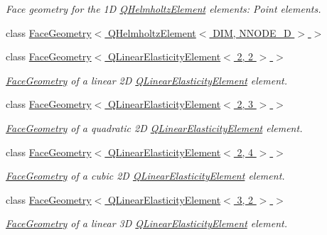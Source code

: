 \begin{DoxyCompactItemize}
\begin{DoxyCompactList}\small\item\em Face geometry for the 1D \hyperlink{classoomph_1_1QHelmholtzElement}{Q\+Helmholtz\+Element} elements\+: Point elements. \end{DoxyCompactList}\item 
class \hyperlink{classoomph_1_1FaceGeometry_3_01QHelmholtzElement_3_01DIM_00_01NNODE__1D_01_4_01_4}{Face\+Geometry$<$ Q\+Helmholtz\+Element$<$ D\+I\+M, N\+N\+O\+D\+E\+\_\+D $>$ $>$}
\item 
class \hyperlink{classoomph_1_1FaceGeometry_3_01QLinearElasticityElement_3_012_00_012_01_4_01_4}{Face\+Geometry$<$ Q\+Linear\+Elasticity\+Element$<$ 2, 2 $>$ $>$}
\begin{DoxyCompactList}\small\item\em \hyperlink{classoomph_1_1FaceGeometry}{Face\+Geometry} of a linear 2D \hyperlink{classoomph_1_1QLinearElasticityElement}{Q\+Linear\+Elasticity\+Element} element. \end{DoxyCompactList}\item 
class \hyperlink{classoomph_1_1FaceGeometry_3_01QLinearElasticityElement_3_012_00_013_01_4_01_4}{Face\+Geometry$<$ Q\+Linear\+Elasticity\+Element$<$ 2, 3 $>$ $>$}
\begin{DoxyCompactList}\small\item\em \hyperlink{classoomph_1_1FaceGeometry}{Face\+Geometry} of a quadratic 2D \hyperlink{classoomph_1_1QLinearElasticityElement}{Q\+Linear\+Elasticity\+Element} element. \end{DoxyCompactList}\item 
class \hyperlink{classoomph_1_1FaceGeometry_3_01QLinearElasticityElement_3_012_00_014_01_4_01_4}{Face\+Geometry$<$ Q\+Linear\+Elasticity\+Element$<$ 2, 4 $>$ $>$}
\begin{DoxyCompactList}\small\item\em \hyperlink{classoomph_1_1FaceGeometry}{Face\+Geometry} of a cubic 2D \hyperlink{classoomph_1_1QLinearElasticityElement}{Q\+Linear\+Elasticity\+Element} element. \end{DoxyCompactList}\item 
class \hyperlink{classoomph_1_1FaceGeometry_3_01QLinearElasticityElement_3_013_00_012_01_4_01_4}{Face\+Geometry$<$ Q\+Linear\+Elasticity\+Element$<$ 3, 2 $>$ $>$}
\begin{DoxyCompactList}\small\item\em \hyperlink{classoomph_1_1FaceGeometry}{Face\+Geometry} of a linear 3D \hyperlink{classoomph_1_1QLinearElasticityElement}{Q\+Linear\+Elasticity\+Element} element. \end{DoxyCompactList}\item 

\end{DoxyCompactItemize}
